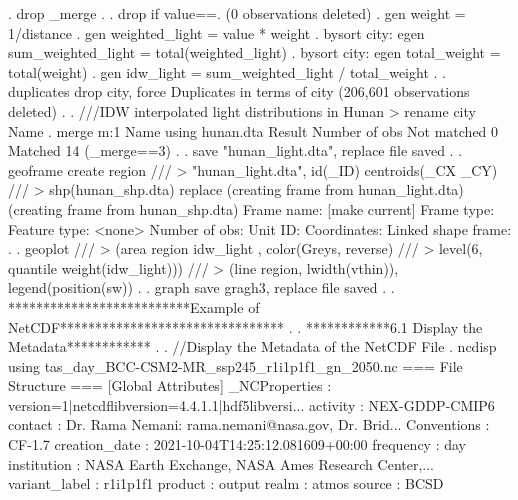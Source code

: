 {\smallskip}
. drop _merge
{\smallskip}
. 
. drop if value==.
(0 observations deleted)
{\smallskip}
. gen weight  = 1/distance
{\smallskip}
. gen weighted_light = value * weight
{\smallskip}
. bysort city: egen sum_weighted_light = total(weighted_light)
{\smallskip}
. bysort city: egen total_weight = total(weight)
{\smallskip}
. gen idw_light = sum_weighted_light / total_weight
{\smallskip}
. 
. duplicates drop city, force
{\smallskip}
Duplicates in terms of city
{\smallskip}
(206,601 observations deleted)
{\smallskip}
. 
. ///IDW interpolated light distributions in Hunan
> rename city Name
{\smallskip}
. merge m:1 Name using hunan.dta
{\smallskip}
    Result                      Number of obs
    Not matched                             0
    Matched                                14  (_merge==3)
{\smallskip}
. 
. save "hunan_light.dta", replace
file{} saved
{\smallskip}
. 
. geoframe create region ///
>    "hunan_light.dta", id(_ID) centroids(_CX _CY) ///
>     shp(hunan_shp.dta) replace
(creating frame {} from hunan_light.dta)
(creating frame {} from hunan_shp.dta)
{\smallskip}
            Frame name: {} [make current]
            Frame type: {}
          Feature type: <none>
         Number of obs: {}
               Unit ID: {}
           Coordinates: {}
    Linked shape frame: {}
{\smallskip}
. 
. geoplot ///
>   (area region idw_light , color(Greys, reverse) ///
>           level(6, quantile weight(idw_light))) ///
>   (line region, lwidth(vthin)), legend(position(sw))
{\smallskip}
. 
. graph save gragh3, replace
file {} saved
{\smallskip}
. 
. **************************Example of NetCDF********************************
. 
. ************6.1 Display the Metadata************
. 
. //Display the Metadata of the NetCDF File
. ncdisp using tas_day_BCC-CSM2-MR_ssp245_r1i1p1f1_gn_2050.nc
{\smallskip}
=== File Structure ===
{\smallskip}
[Global Attributes]
_NCProperties            : version=1|netcdflibversion=4.4.1.1|hdf5libversi...
activity                 : NEX-GDDP-CMIP6
contact                  : Dr. Rama Nemani: rama.nemani@nasa.gov, Dr. Brid...
Conventions              : CF-1.7
creation_date            : 2021-10-04T14:25:12.081609+00:00
frequency                : day
institution              : NASA Earth Exchange, NASA Ames Research Center,...
variant_label            : r1i1p1f1
product                  : output
realm                    : atmos
source                   : BCSD
